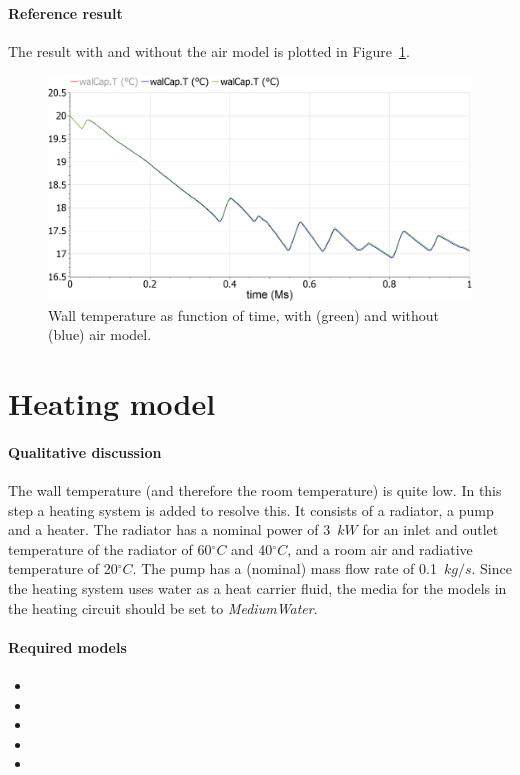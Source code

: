 \documentclass[10pt,a4paper]{article}
\begin{document}
\paragraph{Reference result}
The result with and without the air model is plotted in Figure~\ref{fig:res3}.
\begin{figure}[h]
\centering
\includegraphics[width=0.6\columnwidth]{img/result3.png}
\caption{Wall temperature as function of time, with (green) and without (blue) air model.}
\label{fig:res3}
\end{figure}



\newpage
\section{Heating model}
\paragraph{Qualitative discussion}
The wall temperature (and therefore the room temperature) is quite low. In this step a heating system is added to resolve this. It consists of a radiator, a pump and a heater. The radiator has a nominal power of 3~$kW$ for an inlet and outlet temperature of the radiator of 60$^{\circ}C$ and 40$^{\circ}C$, and a room air and radiative temperature of 20$^{\circ}C$. The pump has a (nominal) mass flow rate of 0.1~$kg/s$. Since the heating system uses water as a heat carrier fluid, the media for the models in the heating circuit should be set to \textit{MediumWater}.

\paragraph{Required models}
\begin{itemize}
\item {}
\item {}
\item {}
\item {}
\item {}
\end{itemize}
\end{document}

